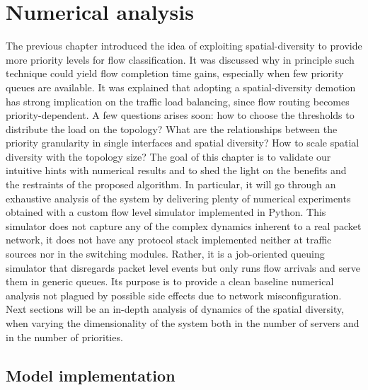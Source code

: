 \chapter{Numerical analysis}
\label{ch:numerical-simulator}
The previous chapter introduced the idea of exploiting spatial-diversity to provide more priority levels for flow classification. It was discussed why in principle such technique could yield flow completion time gains, especially when few priority queues are available. It was explained that adopting a spatial-diversity demotion has strong implication on the traffic load balancing, since flow routing becomes priority-dependent.  A few questions arises soon: how to choose the thresholds to distribute the load on the topology? What are the relationships between the priority granularity in 
single interfaces and spatial diversity? How to scale spatial diversity with the topology size? The goal of this chapter is to validate our intuitive hints with numerical results and to shed the light on the benefits and the restraints of the proposed algorithm. In particular, it will go through an exhaustive analysis of the system by delivering plenty of numerical experiments obtained with a custom flow level simulator implemented in Python. This simulator does not capture any of the complex dynamics inherent to a real packet network, it does not have any protocol stack implemented neither at traffic sources nor in the switching modules. Rather, it is a job-oriented queuing simulator that disregards packet level events but only runs flow arrivals and serve them in generic queues. Its purpose is to provide a clean baseline numerical analysis not plagued by possible side effects due to network misconfiguration.
Next sections will be an in-depth analysis of dynamics of the spatial diversity, when varying the dimensionality of the system both in the number of servers and in the number of priorities.
\section{Model implementation}

